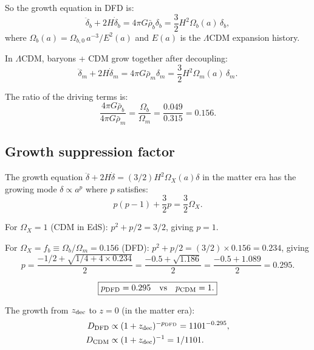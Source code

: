 \documentclass[aps,prd,twocolumn,nofootinbib]{revtex4-2}
\newcommand{\LCDM}{$\Lambda$CDM}
\begin{document}
So the growth equation in DFD is:
\begin{equation}
\ddot\delta_b + 2H\dot\delta_b = 4\pi G\bar\rho_b\delta_b
= \frac{3}{2}H^2\Omega_b(a)\,\delta_b,
\label{eq:growth-DFD-full}
\end{equation}
where $\Omega_b(a) = \Omega_{b,0}\,a^{-3}/E^2(a)$ and $E(a)$
is the \LCDM{} expansion history.

In \LCDM, baryons + CDM grow together after decoupling:
\begin{equation}
\ddot\delta_m + 2H\dot\delta_m = 4\pi G\bar\rho_m\delta_m
= \frac{3}{2}H^2\Omega_m(a)\,\delta_m.
\label{eq:growth-LCDM}
\end{equation}

The ratio of the driving terms is:
\begin{equation}
\frac{4\pi G\bar\rho_b}{4\pi G\bar\rho_m}
= \frac{\Omega_b}{\Omega_m} = \frac{0.049}{0.315} = 0.156.
\label{eq:fb-ratio}
\end{equation}

\subsection{Growth suppression factor}

The growth equation $\ddot\delta + 2H\dot\delta = (3/2)H^2\Omega_X(a)\delta$
in the matter era has the growing mode $\delta \propto a^p$ where $p$
satisfies:
\begin{equation}
p(p-1) + \frac{3}{2}p = \frac{3}{2}\Omega_X.
\label{eq:growth-exponent}
\end{equation}

For $\Omega_X = 1$ (CDM in EdS): $p^2 + p/2 = 3/2$, giving $p = 1$.

For $\Omega_X = f_b \equiv \Omega_b/\Omega_m = 0.156$ (DFD):
$p^2 + p/2 = (3/2)\times 0.156 = 0.234$, giving
\begin{equation}
p = \frac{-1/2 + \sqrt{1/4 + 4\times 0.234}}{2}
= \frac{-0.5 + \sqrt{1.186}}{2}
= \frac{-0.5 + 1.089}{2}
= 0.295.
\end{equation}

\begin{equation}
\boxed{p_{\rm DFD} = 0.295 \quad\text{vs}\quad p_{\rm CDM} = 1.}
\label{eq:growth-exponents}
\end{equation}

The growth from $z_{\rm dec}$ to $z = 0$ (in the matter era):
\begin{align}
D_{\rm DFD} &\propto (1+z_{\rm dec})^{-p_{\rm DFD}}
= 1101^{-0.295}, \\
D_{\rm CDM} &\propto (1+z_{\rm dec})^{-1} = 1/1101.
\end{align}
\end{document}
